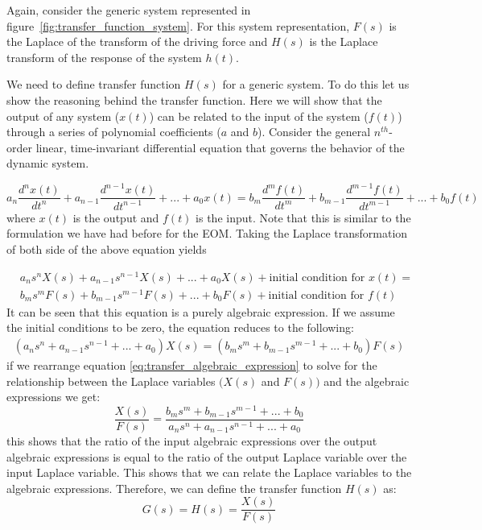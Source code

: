 \documentclass[12pt,letter]{article}
\begin{document}
Again, consider the generic system represented in figure~\ref{fig:transfer_function_system}. For this system representation, $F(s)$ is the Laplace of the transform of the driving force and $H(s)$ is the Laplace transform of the response of the system $h(t)$. 

We need to define transfer function $H(s)$ for a generic system. To do this let us show the reasoning behind the transfer function. Here we will show that the output of any system ($x(t)$) can be related to the input of the system ($f(t)$) through a series of polynomial coefficients ($a$ and $b$). Consider the general $n^{th}$-order linear, time-invariant differential equation that governs the behavior of the dynamic system.

\begin{equation}
a_n\frac{d^nx(t)}{dt^n} + a_{n-1}\frac{d^{n-1}x(t)}{dt^{n-1}} + ... + a_0x(t) = b_m\frac{d^mf(t)}{dt^m} + b_{m-1}\frac{d^{m-1}f(t)}{dt^{m-1}} + ... + b_0f(t)
\end{equation} 
where $x(t)$ is the output and $f(t)$ is the input. Note that this is similar to the formulation we have had before for the EOM. Taking the Laplace transformation of both side of the above equation yields

\begin{eqnarray}
&a_ns^nX(s) + a_{n-1}s^{n-1}X(s) + ... + a_0X(s) + \text{initial condition for } x(t) =   \\
&b_ms^mF(s) + b_{m-1}s^{m-1}F(s) + ... + b_0F(s) + \text{initial condition for } f(t)  \nonumber
\label{eq:transfer_function_polynominal_expansion}
\end{eqnarray}
It can be seen that this equation is a purely algebraic expression. If we assume the initial conditions to be zero, the equation reduces to the following:
\begin{eqnarray}
(a_ns^n + a_{n-1}s^{n-1} + ... + a_0)X(s) =  (b_ms^m + b_{m-1}s^{m-1} + ... + b_0)F(s) 
\label{eq:transfer_algebraic_expression}
\end{eqnarray}
if we rearrange equation \ref{eq:transfer_algebraic_expression} to solve for the relationship between the Laplace variables $\big( X(s)$ and $F(s) \big)$ and the algebraic expressions we get:
\begin{equation}
\frac{X(s)}{F(s)} = \frac{b_ms^m + b_{m-1}s^{m-1} + ... + b_0}{a_ns^n + a_{n-1}s^{n-1} + ... + a_0}
\end{equation}
this shows that the ratio of the input algebraic expressions over the output algebraic expressions is equal to the ratio of the output Laplace variable over the input Laplace variable. This shows that we can relate the Laplace variables to the algebraic expressions. Therefore, we can define the transfer function $H(s)$ as: 
\begin{equation}
G(s) = H(s) = \frac{X(s)}{F(s)}
\label{eq:transfer_function}
\end{equation}
\end{document}
